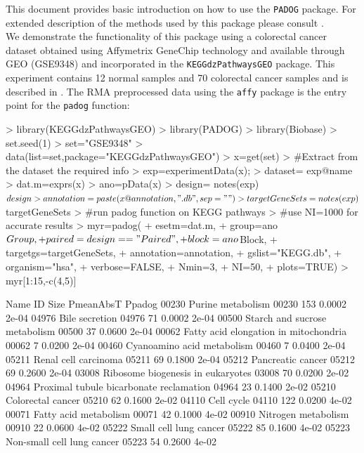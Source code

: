 \documentclass[11pt]{article}
\begin{document}
This document provides basic introduction on how to use the {\tt PADOG} package. For extended 
description of the methods used by this package please consult \cite{TarcaPADOG:2012}.\\ 

We demonstrate the functionality of this package using a colorectal cancer dataset obtained using 
Affymetrix GeneChip technology and available 
through GEO (GSE9348) and incorporated in the {\tt KEGGdzPathwaysGEO} package. This experiment contains 12 normal samples and 70 colorectal cancer samples 
and is described in \cite{pmid20143136}. 
The RMA preprocessed data using the {\tt affy} package is the entry point for the {\tt padog} 
function:
 
\begin{Schunk}
\begin{Sinput}
> library(KEGGdzPathwaysGEO)
> library(PADOG)
> library(Biobase)
> set.seed(1)
> set="GSE9348"
> data(list=set,package="KEGGdzPathwaysGEO")
> x=get(set)
> #Extract from the dataset the required info
> exp=experimentData(x);
> dataset= exp@name
> dat.m=exprs(x)
> ano=pData(x)
> design= notes(exp)$design
> annotation= paste(x@annotation,".db",sep="")
> targetGeneSets= notes(exp)$targetGeneSets
> #run padog function on KEGG pathways
> #use NI=1000 for accurate results
> myr=padog(
+ esetm=dat.m,
+ group=ano$Group,
+ paired=design=="Paired",
+ block=ano$Block,
+ targetgs=targetGeneSets,
+ annotation=annotation,
+ gslist="KEGG.db",
+ organism="hsa",
+ verbose=FALSE,
+ Nmin=3,
+ NI=50,
+ plots=TRUE)
> myr[1:15,-c(4,5)]
\end{Sinput}
\begin{Soutput}
                                         Name    ID Size PmeanAbsT Ppadog
00230                       Purine metabolism 00230  153    0.0002  2e-04
04976                          Bile secretion 04976   71    0.0002  2e-04
00500           Starch and sucrose metabolism 00500   37    0.0600  2e-04
00062   Fatty acid elongation in mitochondria 00062    7    0.0200  2e-04
00460              Cyanoamino acid metabolism 00460    7    0.0400  2e-04
05211                    Renal cell carcinoma 05211   69    0.1800  2e-04
05212                       Pancreatic cancer 05212   69    0.2600  2e-04
03008       Ribosome biogenesis in eukaryotes 03008   70    0.0200  2e-02
04964 Proximal tubule bicarbonate reclamation 04964   23    0.1400  2e-02
05210                       Colorectal cancer 05210   62    0.1600  2e-02
04110                              Cell cycle 04110  122    0.0200  4e-02
00071                   Fatty acid metabolism 00071   42    0.1000  4e-02
00910                     Nitrogen metabolism 00910   22    0.0600  4e-02
05222                  Small cell lung cancer 05222   85    0.1600  4e-02
05223              Non-small cell lung cancer 05223   54    0.2600  4e-02
\end{Soutput}
\end{Schunk}
\end{document}
